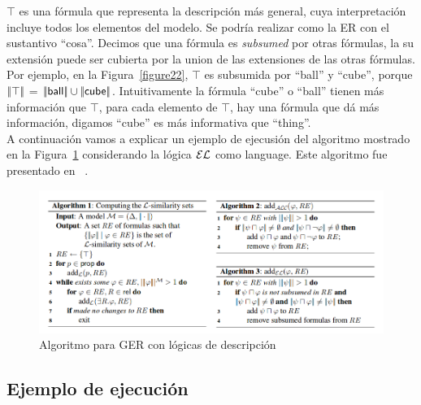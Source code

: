 $\top$ es una f\'ormula que representa la descripci\'on m\'as general, cuya
interpretaci\'on incluye todos los elementos del modelo. Se podr\'ia realizar
como la ER con el sustantivo
``\textsf{cosa}''. Decimos que una f\'ormula es
\emph{subsumed} por otras f\'ormulas, la su extensi\'on puede ser cubierta por la
union de las extensiones de las otras f\'ormulas. Por ejemplo, en la
Figura~\ref{figure22}, $\top$ es subsumida por ``\textsf{ball}'' y
``\textsf{cube}'', porque $|\!|\top|\!|$ = $|\!|\textsf{ball}|\!|
\cup |\!|\textsf{cube}|\!|$.
Intuitivamente la f\'ormula ``\textsf{cube}'' o ``\textsf{ball}'' tienen m\'as informaci\'on que $\top$, para cada elemento de $\top$, hay una f\'ormula que d\'a m\'as informaci\'on, digamos ``\textsf{cube}'' es m\'as informativa que ``\textsf{thing}''.\\

A continuaci\'on vamos a explicar un ejemplo de ejecusi\'on del
algoritmo mostrado en la Figura~\ref{algoritmoOriginal} considerando la l\'ogica 
$\mathcal{EL}$ como language. Este algoritmo fue presentado en
~\cite{arec2:2008:Areces}.

\begin{figure}[h!]
\begin{center}
\includegraphics[width=\textwidth]{images/algoritmoOriginal.png}
\end{center}
\vspace*{-2em}
\caption{Algoritmo para GER con l\'ogicas de descripci\'on}
\label{algoritmoOriginal}
\end{figure}

\subsection{Ejemplo de ejecuci\'on}

